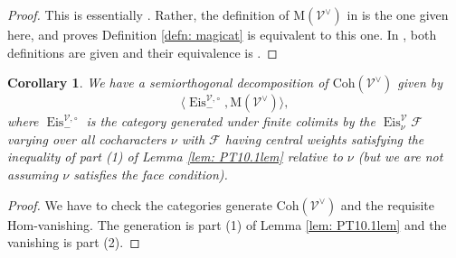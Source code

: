 \documentclass{amsart}
\newtheorem{corollary}[theorem]{Corollary}
\theoremstyle{definition}
\theoremstyle{remark}
\numberwithin{equation}{section}
\newcommand{\mc}{\mathcal}
\newcommand{\Hom}{\mathrm{Hom}}
\DeclareMathOperator{\Eis}{\mathrm{Eis}}
\newcommand{\Coh}{\mathrm{Coh}}
\newcommand{\M}{\mathrm{M}}
\begin{document}
\begin{proof}
    This is essentially \cite[Corollary 3.35]{PTqBPSsymquiverswithpotential}. Rather, the definition of $\M(\mc{V}^{\vee})$ in \cite{PTDolbeault} is the one given here, and \cite[Proposition 6.5]{PTDolbeault} proves Definition \ref{defn: magicat} is equivalent to this one. In \cite{PTqBPSsymquiverswithpotential}, both definitions are given and their equivalence is \cite[Corollary 3.35]{PTqBPSsymquiverswithpotential}.
\end{proof}

\begin{corollary}{\label{cor: magicSODs}}
We have a semiorthogonal decomposition of $\Coh(\mc{V}^{\vee})$ given by
\begin{equation*}
\langle \Eis_{-}^{\mc{V}, \circ} , \M(\mc{V}^{\vee}) \rangle,
\end{equation*}
   where $\Eis^{\mc{V}, \circ}_-$ is the category generated under finite colimits by the $\Eis^{\mc{V}}_{\nu} \mc{F}$ varying over all cocharacters $\nu$ with $\mc{F}$ having central weights satisfying the inequality of part (1) of Lemma \ref{lem: PT10.1lem} relative to $\nu$ (but we are not assuming $\nu$ satisfies the face condition).
\end{corollary}
\begin{proof}
    We have to check the categories generate $\Coh(\mc{V}^{\vee})$ and the requisite $\Hom$-vanishing. The generation is part (1) of Lemma \ref{lem: PT10.1lem} and the vanishing is part (2).
\end{proof}
\end{document}
